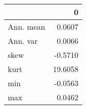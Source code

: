 \begin{tabular}{lr}
\toprule
{} &        0 \\
\midrule
Ann. mean &   0.0607 \\
Ann. var  &   0.0066 \\
skew      &  -0.5710 \\
kurt      &  19.6058 \\
min       &  -0.0563 \\
max       &   0.0462 \\
\bottomrule
\end{tabular}
